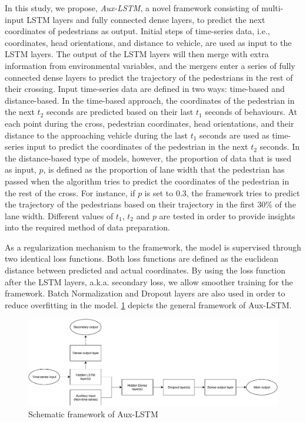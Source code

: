 In this study, we propose, \textit{Aux-LSTM}, a novel framework consisting of multi-input LSTM layers and fully connected dense layers, to predict the next coordinates of pedestrians as output. Initial steps of time-series data, i.e., coordinates, head orientations, and distance to vehicle, are used as input to the LSTM layers. The output of the LSTM layers will then merge with extra information from environmental variables, and the mergers enter a series of fully connected dense layers to predict the trajectory of the pedestrians in the rest of their crossing. Input time-series data are defined in two ways: time-based and distance-based. In the time-based approach, the coordinates of the pedestrian in the next $t_2$ seconds are predicted based on their last $t_1$ seconds of behaviours. At each point during the cross, pedestrian coordinates, head orientations, and their distance to the approaching vehicle during the last $t_1$ seconds are used as time-series input to predict the coordinates of the pedestrian in the next $t_2$ seconds. In the distance-based type of models, however, the proportion of data that is used as input, $p$, is defined as the proportion of lane width that the pedestrian has passed when the algorithm tries to predict the coordinates of the pedestrian in the rest of the cross. For instance, if $p$ is set to 0.3, the framework tries to predict the trajectory of the pedestrians based on their trajectory in the first 30\% of the lane width. Different values of $t_1$, $t_2$ and $p$ are tested in order to provide insights into the required method of data preparation.

As a regularization mechanism to the framework, the model is supervised through two identical loss functions. Both loss functions are defined as the euclidean distance between predicted and actual coordinates. By using the loss function after the LSTM layers, a.k.a. secondary loss, we allow smoother training for the framework. Batch Normalization and Dropout layers are also used in order to reduce overfitting in the model. \cref{fig:Tframe} depicts the general framework of Aux-LSTM.
\begin{figure}
    \centering
    \includegraphics[scale=0.57]{chapter_6/figures/frame.pdf}
    \caption{Schematic framework of Aux-LSTM}
    \label{fig:Tframe}
\end{figure}